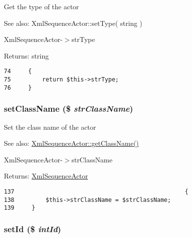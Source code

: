 Get the type of the actor

\begin{Desc}
\item[See also:]XmlSequenceActor::setType( string ) 

XmlSequenceActor-$>$strType \end{Desc}
\begin{Desc}
\item[Returns:]string \end{Desc}


\begin{Code}\begin{verbatim}74     {
75         return $this->strType;
76     }
\end{verbatim}
\end{Code}


\hypertarget{class_xml_sequence_actor_35ca4f6ef761ae92cfbd3c42f73793e7}{
\subsubsection[{setClassName}]{\setlength{\rightskip}{0pt plus 5cm}setClassName (\$ {\em strClassName})}}
\label{class_xml_sequence_actor_35ca4f6ef761ae92cfbd3c42f73793e7}


Set the class name of the actor

\begin{Desc}
\item[See also:]\hyperlink{class_xml_sequence_actor_b8f8ee56588ebf5091c288e44ebdfaf4}{XmlSequenceActor::getClassName()} 

XmlSequenceActor-$>$strClassName \end{Desc}
\begin{Desc}
\item[Returns:]\hyperlink{class_xml_sequence_actor}{XmlSequenceActor} \end{Desc}


\begin{Code}\begin{verbatim}137                                                 {
138         $this->strClassName = $strClassName;
139     }
\end{verbatim}
\end{Code}


\hypertarget{class_xml_sequence_actor_7a72a09ca694e9785f917216f4d9180a}{
\subsubsection[{setId}]{\setlength{\rightskip}{0pt plus 5cm}setId (\$ {\em intId})}}
\label{class_xml_sequence_actor_7a72a09ca694e9785f917216f4d9180a}


